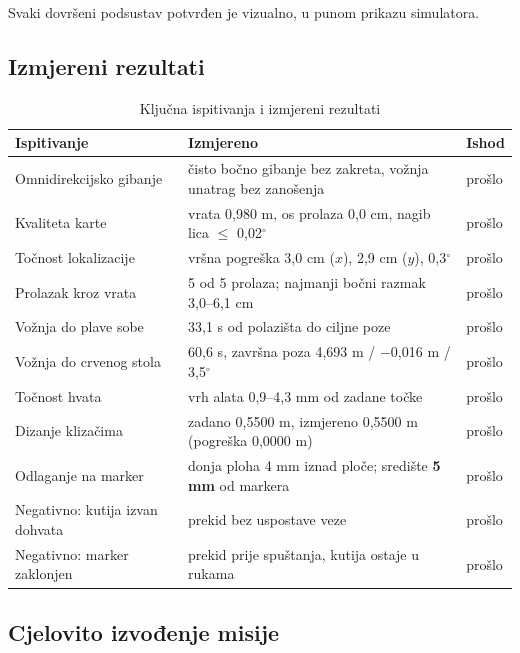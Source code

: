 \documentclass[12pt,a4paper]{article}
\begin{document}
Svaki dovršeni podsustav potvrđen je vizualno, u punom prikazu simulatora.

\subsection{Izmjereni rezultati}

\begin{table}[!htbp]
    \centering
    \caption{Ključna ispitivanja i izmjereni rezultati}
    \label{tab:rezultati}
    \scriptsize
    \begin{tabularx}{\textwidth}{@{}l X l@{}}
        \toprule
        \textbf{Ispitivanje} & \textbf{Izmjereno} & \textbf{Ishod} \\
        \midrule
        Omnidirekcijsko gibanje & čisto bočno gibanje bez zakreta, vožnja unatrag bez zanošenja & prošlo \\
        Kvaliteta karte         & vrata 0,980 m, os prolaza 0,0 cm, nagib lica $\le$ 0,02$^\circ$ & prošlo \\
        Točnost lokalizacije    & vršna pogreška 3,0 cm ($x$), 2,9 cm ($y$), 0,3$^\circ$ & prošlo \\
        Prolazak kroz vrata     & 5 od 5 prolaza; najmanji bočni razmak 3,0--6,1 cm & prošlo \\
        Vožnja do plave sobe    & 33,1 s od polazišta do ciljne poze & prošlo \\
        Vožnja do crvenog stola & 60,6 s, završna poza 4,693 m / $-$0,016 m / 3,5$^\circ$ & prošlo \\
        Točnost hvata           & vrh alata 0,9--4,3 mm od zadane točke & prošlo \\
        Dizanje klizačima       & zadano 0,5500 m, izmjereno 0,5500 m (pogreška 0,0000 m) & prošlo \\
        Odlaganje na marker     & donja ploha 4 mm iznad ploče; središte \textbf{5 mm} od markera & prošlo \\
        Negativno: kutija izvan dohvata & prekid bez uspostave veze & prošlo \\
        Negativno: marker zaklonjen      & prekid prije spuštanja, kutija ostaje u rukama & prošlo \\
        \bottomrule
    \end{tabularx}
\end{table}

\subsection{Cjelovito izvođenje misije}
\end{document}
